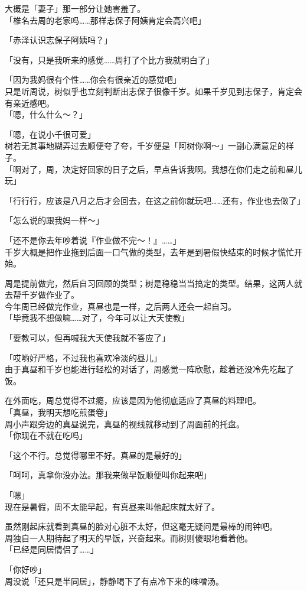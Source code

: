 大概是「妻子」那一部分让她害羞了。\\

「椎名去周的老家吗……那样志保子阿姨肯定会高兴吧」

「赤泽认识志保子阿姨吗？」

「没有，只是我听来的感觉……周打了个比方我就明白了」

「因为我妈很有个性……你会有很亲近的感觉吧」\\

只是听周说，树似乎也立刻判断出志保子很像千岁。如果千岁见到志保子，肯定会有亲近感吧。\\

「嗯，什么什么～？」

「嗯，在说小千很可爱」\\

树若无其事地糊弄过去顺便夸了夸，千岁便是「阿树你啊～」一副心满意足的样子。\\

「啊对了，周，决定好回家的日子之后，早点告诉我啊。我想在你们走之前和昼儿玩」

「行行行，应该是八月之后才会回去，在这之前你就玩吧……还有，作业也去做了」

「怎么说的跟我妈一样～」

「还不是你去年吵着说『作业做不完～！』……」\\

千岁大概是把作业拖到后面一口气做的类型，去年是到暑假快结束的时候才慌忙开始。

周是提前做完，然后自习回顾的类型；树是稳稳当当搞定的类型。结果，这两人就去帮千岁做作业了。\\

今年周已经做完作业，真昼也是一样，之后两人还会一起自习。\\

「毕竟我不想做嘛……对了，今年可以让大天使教」

「要教可以，但再喊我大天使我就不答应了」

「哎哟好严格，不过我也喜欢冷淡的昼儿」\\

由于真昼和千岁也能进行轻松的对话了，周感觉一阵欣慰，趁着还没冷先吃起了饭。

在外面吃，周总觉得不过瘾，应该是因为他彻底适应了真昼的料理吧。\\

「真昼，我明天想吃煎蛋卷」\\

周小声跟旁边的真昼说完，真昼的视线就移动到了周面前的托盘。\\

「你现在不就在吃吗」

「这个不行。总觉得哪里不好。真昼的是最好的」

「呵呵，真拿你没办法。那我来做早饭顺便叫你起来吧」

「嗯」\\

现在是暑假，周不太能早起，有真昼来叫他起床就太好了。

虽然刚起床就看到真昼的脸对心脏不太好，但这毫无疑问是最棒的闹钟吧。\\

周独自一人期待起了明天的早饭，兴奋起来。而树则傻眼地看着他。\\

「已经是同居情侣了……」

「你好吵」\\

周没说「还只是半同居」，静静喝下了有点冷下来的味噌汤。

